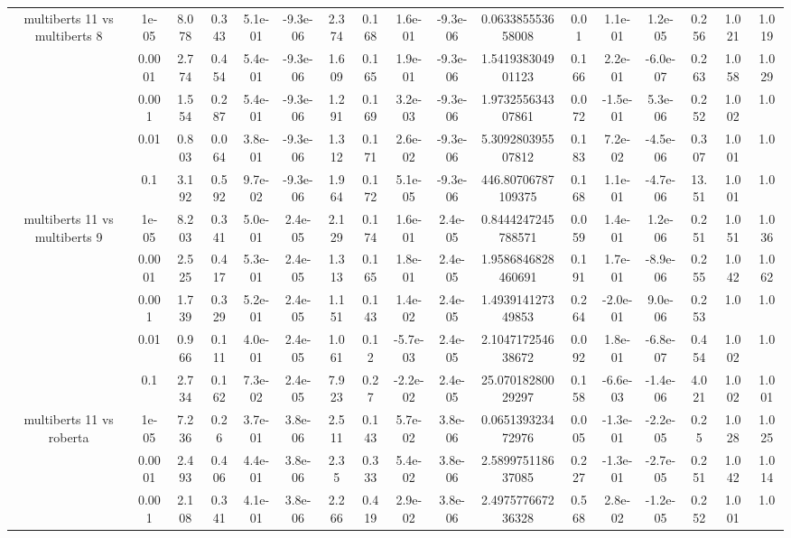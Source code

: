 \begin{tabular}{|c|c|c|c|c|c|c|c|c|c|c|c|c|c|c|c|c|}
\hline
\multirow{5}{*}{multiberts 11 vs multiberts 8} & 1e-05 & 8.078 & 0.343 & 5.1e-01 & -9.3e-06 & 2.374 & 0.168 & 1.6e-01 & -9.3e-06 & 0.063385553658008 & 0.01 & 1.1e-01 & 1.2e-05 & 0.256 & 1.021 & 1.019 \\
 & 0.0001 & 2.774 & 0.454 & 5.4e-01 & -9.3e-06 & 1.609 & 0.165 & 1.9e-01 & -9.3e-06 & 1.541938304901123 & 0.166 & 2.2e-01 & -6.0e-07 & 0.263 & 1.058 & 1.029 \\
 & 0.001 & 1.554 & 0.287 & 5.4e-01 & -9.3e-06 & 1.291 & 0.169 & 3.2e-03 & -9.3e-06 & 1.973255634307861 & 0.072 & -1.5e-01 & 5.3e-06 & 0.252 & 1.002 & 1.0 \\
 & 0.01 & 0.803 & 0.064 & 3.8e-01 & -9.3e-06 & 1.312 & 0.171 & 2.6e-02 & -9.3e-06 & 5.309280395507812 & 0.183 & 7.2e-02 & -4.5e-06 & 0.307 & 1.001 & 1.0 \\
 & 0.1 & 3.192 & 0.592 & 9.7e-02 & -9.3e-06 & 1.964 & 0.172 & 5.1e-05 & -9.3e-06 & 446.80706787109375 & 0.168 & 1.1e-01 & -4.7e-06 & 13.51 & 1.001 & 1.0 \\
\hline
\multirow{5}{*}{multiberts 11 vs multiberts 9} & 1e-05 & 8.203 & 0.341 & 5.0e-01 & 2.4e-05 & 2.129 & 0.174 & 1.6e-01 & 2.4e-05 & 0.8444247245788571 & 0.059 & 1.4e-01 & 1.2e-06 & 0.251 & 1.051 & 1.036 \\
 & 0.0001 & 2.525 & 0.417 & 5.3e-01 & 2.4e-05 & 1.313 & 0.165 & 1.8e-01 & 2.4e-05 & 1.9586846828460691 & 0.191 & 1.7e-01 & -8.9e-06 & 0.255 & 1.042 & 1.062 \\
 & 0.001 & 1.739 & 0.329 & 5.2e-01 & 2.4e-05 & 1.151 & 0.143 & 1.4e-02 & 2.4e-05 & 1.493914127349853 & 0.264 & -2.0e-01 & 9.0e-06 & 0.253 & 1.0 & 1.0 \\
 & 0.01 & 0.966 & 0.111 & 4.0e-01 & 2.4e-05 & 1.061 & 0.12 & -5.7e-03 & 2.4e-05 & 2.104717254638672 & 0.092 & 1.8e-01 & -6.8e-07 & 0.454 & 1.002 & 1.0 \\
 & 0.1 & 2.734 & 0.162 & 7.3e-02 & 2.4e-05 & 7.923 & 0.27 & -2.2e-02 & 2.4e-05 & 25.07018280029297 & 0.158 & -6.6e-03 & -1.4e-06 & 4.021 & 1.002 & 1.001 \\
\hline
\multirow{5}{*}{multiberts 11 vs roberta } & 1e-05 & 7.236 & 0.26 & 3.7e-01 & 3.8e-06 & 2.511 & 0.143 & 5.7e-02 & 3.8e-06 & 0.065139323472976 & 0.005 & -1.3e-01 & -2.2e-05 & 0.25 & 1.028 & 1.025 \\
 & 0.0001 & 2.493 & 0.406 & 4.4e-01 & 3.8e-06 & 2.35 & 0.333 & 5.4e-02 & 3.8e-06 & 2.589975118637085 & 0.227 & -1.3e-01 & -2.7e-05 & 0.251 & 1.042 & 1.014 \\
 & 0.001 & 2.108 & 0.341 & 4.1e-01 & 3.8e-06 & 2.266 & 0.419 & 2.9e-02 & 3.8e-06 & 2.497577667236328 & 0.568 & 2.8e-02 & -1.2e-05 & 0.252 & 1.001 & 1.0 \\

\end{tabular}
